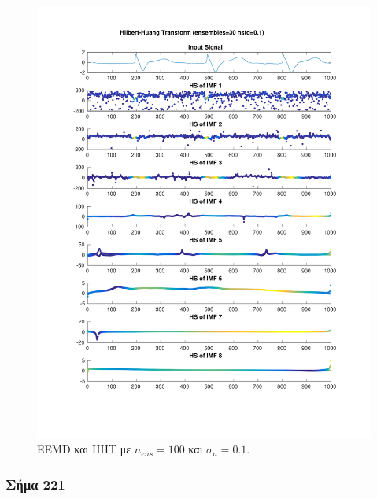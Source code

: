 \documentclass[11pt,a4paper]{article}
\begin{document}
\begin{figure}[H]
\begin{minipage}{0.48\textwidth}
	\includegraphics[width=\textwidth]{fig/217l1_hht_ensemble.pdf}
\end{minipage}
\vfill
\caption{EEMD και HHT με $n_{ens}=100$ και $\sigma_n = 0.1$.}
\label{fig:217l1_hht_ensemble}
\end{figure}

\subsubsection*{Σήμα 221}
\end{document}
